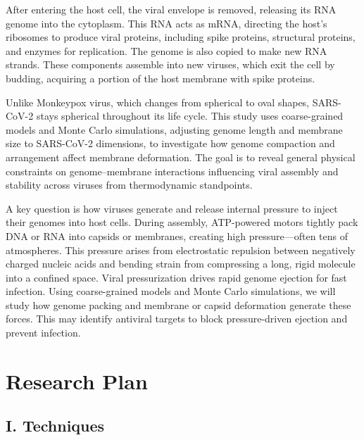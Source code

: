 \documentclass[12pt]{article}
\begin{document}
\begin{flushleft}
After entering the host cell, the viral envelope is removed, releasing its  RNA genome into the cytoplasm. This RNA acts as mRNA, directing the host’s ribosomes to produce viral proteins, including spike proteins, structural proteins, and enzymes for replication. The genome is also copied to make new RNA strands. These components assemble into new viruses, which exit the cell by budding, acquiring a portion of the host membrane with spike proteins. 
 
Unlike Monkeypox virus, which changes from spherical to oval shapes, SARS-CoV-2 stays spherical throughout its life cycle. This study uses coarse-grained models and Monte Carlo simulations, adjusting genome length and membrane size to SARS-CoV-2 dimensions, to investigate how genome compaction and arrangement affect membrane deformation. The goal is to reveal general physical constraints on genome–membrane interactions influencing viral assembly and stability across viruses from thermodynamic standpoints.

A key question is how viruses generate and release internal pressure to inject their genomes into host cells. During assembly, ATP-powered motors tightly pack DNA or RNA into capsids or membranes, creating high pressure—often tens of atmospheres. This pressure arises from electrostatic repulsion between negatively charged nucleic acids and bending strain from compressing a long, rigid molecule into a confined space\cite{BrandarizNunez2019}. Viral pressurization drives rapid genome ejection for fast infection. Using coarse-grained models and Monte Carlo simulations, we will study how genome packing and membrane or capsid deformation generate these forces. This may identify antiviral targets to block pressure-driven ejection and prevent infection.

\section*{Research Plan}
\subsection*{I. Techniques}
 \subsection*{}






\end{flushleft}
\end{document}

